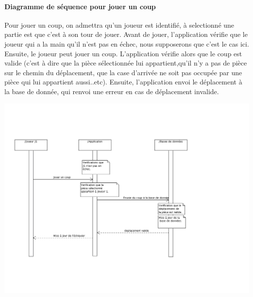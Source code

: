 \documentclass[10pt,a4paper]{report}
\begin{document}
\paragraph{Diagramme de séquence pour jouer un coup}Pour jouer un coup, on admettra qu'un joueur est identifié, à selectionné une partie est que c'est à son tour de jouer. Avant de jouer, l'application vérifie que le joueur qui a la main qu'il n'est pas en échec, nous supposerons que c'est le cas ici. Ensuite, le joueur peut jouer un coup. L'application vérifie alors que le coup est valide (c'est à dire que la pièce sélectionnée lui appartient,qu'il n'y a pas de pièce sur le chemin du déplacement, que la case d'arrivée ne soit pas occupée par une pièce qui lui appartient aussi..etc). Ensuite, l'application envoi le déplacement à la base de donnée, qui renvoi une erreur en cas de déplacement invalide. 
\begin{center}
\includegraphics[width=18cm]{DiagSeqJouerCoup.png}
\end{center}
\end{document}
